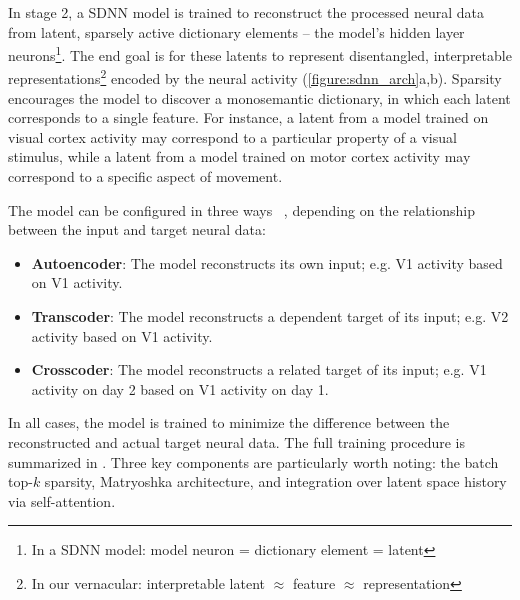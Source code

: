In stage 2, a SDNN model is trained to reconstruct the processed neural data from latent, sparsely active dictionary elements -- the model's hidden layer neurons\footnote{In a SDNN model: model neuron = dictionary element = latent}. The end goal is for these latents to represent disentangled, interpretable representations\footnote{In our vernacular: interpretable latent $\approx$ feature $\approx$ representation} encoded by the neural activity (\autoref{figure:sdnn_arch}a,b). Sparsity encourages the model to discover a monosemantic dictionary, in which each latent corresponds to a single feature. For instance, a latent from a model trained on visual cortex activity may correspond to a particular property of a visual stimulus, while a latent from a model trained on motor cortex activity may correspond to a specific aspect of movement.

The model can be configured in three ways ~\cite{lindsey_2024_crosscoders}, depending on the relationship between the input and target neural data:
\begin{itemize}[nosep, leftmargin=1em, topsep=-0.5em]
    \item \textbf{Autoencoder}: The model reconstructs its own input; e.g. V1 activity based on V1 activity.
    \item \textbf{Transcoder}: The model reconstructs a dependent target of its input; e.g. V2 activity based on V1 activity.
    \item \textbf{Crosscoder}: The model reconstructs a related target of its input; e.g. V1 activity on day 2 based on V1 activity on day 1.
\end{itemize}
In all cases, the model is trained to minimize the difference between the reconstructed and actual target neural data. The full training procedure is summarized in . Three key components are particularly worth noting: the batch top-$k$ sparsity, Matryoshka architecture, and integration over latent space history via self-attention.

